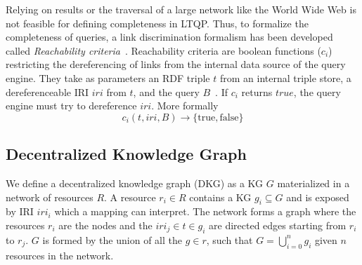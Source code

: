Relying on results or the traversal of a large network like the World Wide Web is not feasible for defining completeness in LTQP.
Thus, to formalize the completeness of queries, a link discrimination formalism has been developed called \emph{Reachability criteria}~\cite{Hartig2012}.
Reachability criteria are boolean functions ($c_i$) restricting the dereferencing of links from the internal data source of the query engine.
They take as parameters an RDF triple $t$ from an internal triple store, a dereferenceable IRI $iri$ from $t$, and the query $B$~\cite{Hartig2012}.
If $c_i$ returns $true$, the query engine must try to dereference $iri$.
More formally
\begin{equation}\label{eq:reachabilityCriteria}
c_i(t, iri, B) \rightarrow \{\mathrm{true}, \mathrm{false}\}
\end{equation}

\subsection{Decentralized Knowledge Graph}
We define a decentralized knowledge graph (DKG) as a KG $G$ materialized in a network of resources $R$.
A resource $r_i \in R$ contains a KG $g_i \subseteq G$ and is exposed by IRI $iri_i$ which a mapping can interpret.
The network forms a graph where the resources $r_i$ are the nodes and the $iri_j \in t \in g_i$ are directed edges starting from $r_i$ to $r_j$.
$G$ is formed by the union of all the $g \in r$, such that $G = \bigcup_{i=0}^{n}g_i$ given $n$ resources in the network.